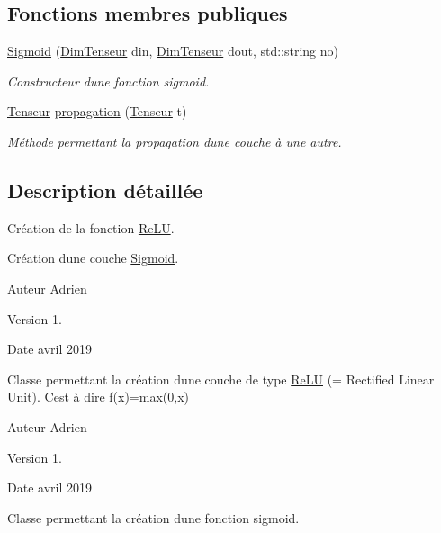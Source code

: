 \subsection*{Fonctions membres publiques}
\begin{DoxyCompactItemize}
\item 
\mbox{\label{class_sigmoid_a6085e021ce6eb13fd04b46387f4b3ccf}} 
\hyperlink{class_sigmoid_a6085e021ce6eb13fd04b46387f4b3ccf}{Sigmoid} (\hyperlink{class_dim_tenseur}{Dim\+Tenseur} din, \hyperlink{class_dim_tenseur}{Dim\+Tenseur} dout, std\+::string no)
\begin{DoxyCompactList}\small\item\em Constructeur d\textquotesingle{}une fonction sigmoid. \end{DoxyCompactList}\item 
\hyperlink{class_tenseur}{Tenseur} \hyperlink{class_sigmoid_a6bd1f6bbc49bd7e634dc33701aee420c}{propagation} (\hyperlink{class_tenseur}{Tenseur} t)
\begin{DoxyCompactList}\small\item\em Méthode permettant la propagation d\textquotesingle{}une couche à une autre. \end{DoxyCompactList}\end{DoxyCompactItemize}


\subsection{Description détaillée}
Création de la fonction \hyperlink{class_re_l_u}{Re\+LU}. 

Création d\textquotesingle{}une couche \hyperlink{class_sigmoid}{Sigmoid}.

\begin{DoxyAuthor}{Auteur}
Adrien 
\end{DoxyAuthor}
\begin{DoxyVersion}{Version}
1. 
\end{DoxyVersion}
\begin{DoxyDate}{Date}
avril 2019
\end{DoxyDate}
Classe permettant la création d\textquotesingle{}une couche de type \hyperlink{class_re_l_u}{Re\+LU} (= Rectified Linear Unit). C\textquotesingle{}est à dire f(x)=max(0,x)

\begin{DoxyAuthor}{Auteur}
Adrien 
\end{DoxyAuthor}
\begin{DoxyVersion}{Version}
1. 
\end{DoxyVersion}
\begin{DoxyDate}{Date}
avril 2019
\end{DoxyDate}
Classe permettant la création d\textquotesingle{}une fonction sigmoid. 

